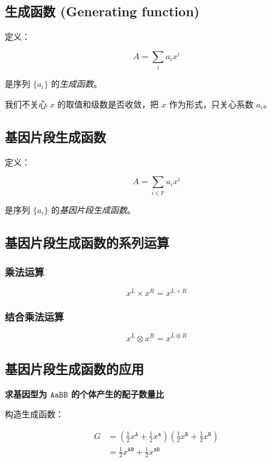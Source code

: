 \documentclass{article}
\begin{document}
\subsection{生成函数 (Generating function)} 

定义：

$$A=\sum_{i} a_i x^{i}$$

是序列 $\{a_i\}$ 的\textsl{生成函数}。

我们不关心 $x$ 的取值和级数是否收敛，把 $x$ 作为形式，只关心系数 $a_i$。

\subsection{基因片段生成函数}

定义：

$$A=\sum_{i \in \mathbb{P}} a_i x^{i}$$

是序列 $\{a_i\}$ 的\textsl{基因片段生成函数}。

\subsection{基因片段生成函数的系列运算}

\subsubsection*{乘法运算}

$$x^L \times x^R=x^{L+R}$$

\subsubsection*{结合乘法运算}

$$x^L \otimes x^R=x^{L \oplus R}$$

\subsection{基因片段生成函数的应用}

\textbf{求基因型为 $\texttt{AaBB}$ 的个体产生的配子数量比}

构造生成函数：

$$\begin{aligned}
    G &= (\frac{1}{2} x^{\texttt{A}}+ \frac{1}{2}x^{\texttt{a}})(\frac{1}{2} x^{\texttt{B}}+ \frac{1}{2}x^{\texttt{B}}) \\
                &= \frac{1}{2} x^{\texttt{AB}} + \frac{1}{2} x^{\texttt{aB}}
\end{aligned}$$
\end{document}
